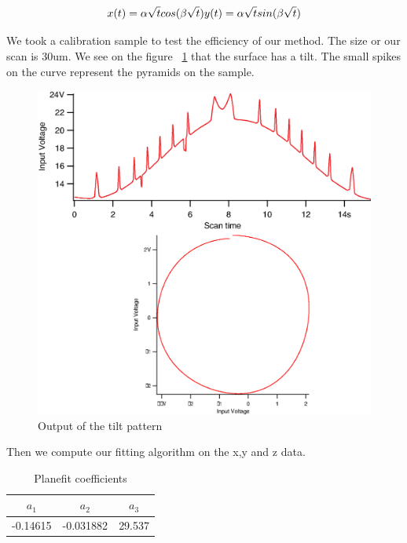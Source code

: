 \begin{equation}\label{eqarchimedean}
x(t)= \alpha \sqrt{t} cos(\beta \sqrt{t})\\
y(t)= \alpha \sqrt{t} sin(\beta \sqrt{t})
\end{equation}

We took a calibration sample to test the efficiency of our method. The size or our scan is 30um. We see on the figure  ~\ref{tiltcircle} that the surface has a tilt. The small spikes on the curve represent the pyramids on the sample.


\begin{figure}[H]
  \centering
  \includegraphics[scale=0.3]{images/tiltcircles.eps}
    \caption{Output of the tilt pattern}
  \label{tiltcircle}
\end{figure}

Then we compute our fitting algorithm on the x,y and z data.
\begin{table}[H]
\caption{Planefit coefficients} %
\centering %
\begin{tabular}{c c c} %
\hline\hline %
$a_1$ & $a_2$ & $a_3$ \\ [0.5ex] %
\hline %
-0.14615  & -0.031882 & 29.537 \\[1ex]

\hline %
\end{tabular}
\label{table:planefit} %
\end{table}

